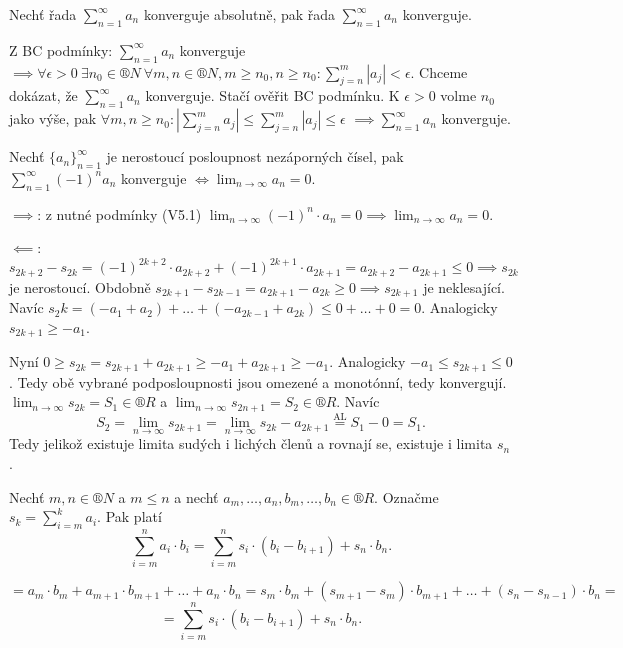 \documentclass[12pt]{article}                   %
\begin{document}
        \begin{veta}
            Nechť řada $\sum_{n=1}^∞ a_n$ konverguje absolutně, pak řada $\sum_{n=1}^∞ a_n$ konverguje.

            \begin{dukazin}
                Z BC podmínky: $\sum_{n=1}^∞ a_n$ konverguje $\implies \forall\epsilon > 0 \ \exists n_0 \in ®N\ \forall m, n \in ®N, m ≥ n_0, n ≥ n_0: \sum_{j=n}^m \left| a_j \right| < \epsilon$. Chceme dokázat, že $\sum_{n=1}^∞ a_n$ konverguje. Stačí ověřit BC podmínku. K $\epsilon > 0$ volme $n_0$ jako výše, pak $\forall m, n ≥ n_0: \left| \sum_{j=n}^m a_j \right| ≤ \sum_{j=n}^m \left| a_j \right| ≤ \epsilon$ $\implies \sum_{n=1}^∞ a_n$ konverguje.
            \end{dukazin}
        \end{veta}

        \begin{veta}
            Nechť $\{a_n\}_{n = 1}^∞$ je nerostoucí posloupnost nezáporných čísel, pak $\sum_{n=1}^∞ (-1)^n a_n$ konverguje $\Leftrightarrow \lim_{n \rightarrow ∞} a_n = 0$.

            \begin{dukazin}
                $\implies$: z nutné podmínky (V5.1) $\lim_{n \rightarrow ∞} (-1)^n·a_n = 0 \implies \lim_{n \rightarrow ∞} a_n = 0$.

                $\impliedby$: $s_{2k + 2} - s_{2k} = (-1)^{2k+2}·a_{2k+2} + (-1)^{2k+1}·a_{2k+1} = a_{2k+2} - a_{2k+1} ≤ 0 \implies s_{2k}$ je nerostoucí. Obdobně $s_{2k+1} - s_{2k-1} = a_{2k+1} - a_{2k} ≥ 0 \implies s_{2k+1}$ je neklesající. Navíc $s_2k = (-a_1 + a_2) + … + (-a_{2k-1} + a_{2k}) ≤ 0 + … + 0 = 0$. Analogicky $s_{2k+1} ≥ -a_1$.

                Nyní $0 ≥ s_{2k} = s_{2k+1} + a_{2k+1} ≥ -a_1 + a_{2k+1} ≥ -a_1$. Analogicky $-a_1 ≤ s_{2k+1} ≤ 0$. Tedy obě vybrané podposloupnosti jsou omezené a monotónní, tedy konvergují. $\lim_{n \rightarrow ∞} s_{2k} = S_1 \in ®R$ a $\lim_{n \rightarrow ∞} s_{2n+1} = S_2 \in ®R$. Navíc
                $$ S_2 = \lim_{n \rightarrow ∞} s_{2k+1} = \lim_{n \rightarrow ∞} s_{2k} - a_{2k+1} \overset{\text{AL}}{=} S_1 - 0 = S_1. $$
                Tedy jelikož existuje limita sudých i lichých členů a rovnají se, existuje i limita $s_n$.
            \end{dukazin}
        \end{veta}

        \begin{lemma}
            Nechť $m, n \in ®N$ a $m ≤ n$ a nechť $a_m, …, a_n, b_m, …, b_n \in ®R$. Označme $s_k = \sum_{i=m}^k a_i$. Pak platí
            $$ \sum_{i=m}^n a_i·b_i = \sum_{i=m}^n s_i·(b_i - b_{i+1}) + s_n·b_n. $$
            
            \begin{dukazin}
                $$ = a_m · b_m + a_{m+1} · b_{m+1} + … + a_n·b_n = s_m·b_m + (s_{m+1} - s_m)· b_{m+1} + … + (s_n - s_{n-1})·b_n = $$
                $$ = \sum_{i=m}^n s_i·(b_i - b_{i+1}) + s_n·b_n. $$ 
            \end{dukazin}
        \end{lemma}
\end{document}
